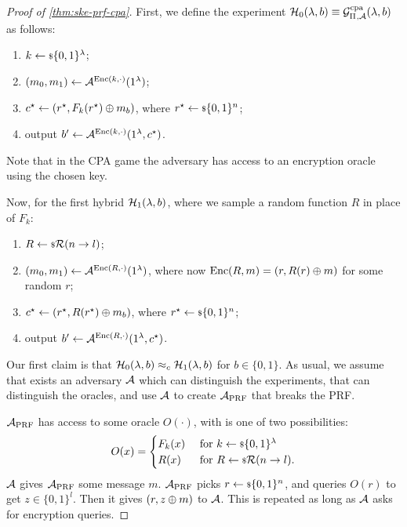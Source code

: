 \begin{proof}[Proof of \cref{thm:ske-prf-cpa}]
	First, we define the experiment $\mathcal{H}_0(\lambda, b) \equiv \mathcal{G}^{\scriptstyle \text{cpa}}_{\Pi_{},\mathcal{A}}(\lambda, b)$ as follows:
	\begin{enumerate}
		\item $k \leftarrow {\scriptstyle \$} {\{0,1\}^{\lambda}}$;
		\item $(m_0,m_1) \leftarrow \mathcal{A}^{\mathrm{Enc}(k, \cdot)} (1^{\lambda})$;
		\item $c^{\star} \leftarrow (r^{\star}, F_k(r^{\star}) \oplus m_b)$, where $r^{\star} \leftarrow {\scriptstyle \$} {\{0,1\}^{n}}$;
		\item output $b' \leftarrow \mathcal{A}^{\mathrm{Enc}(k, \cdot)} (1^{\lambda}, c^{\star})$.
	\end{enumerate}
	Note that in the \ac{CPA} game the adversary has access to an encryption oracle using the chosen key.

	Now, for the first hybrid $\mathcal{H}_1(\lambda, b)$, where we sample a random function $R$ in place of $F_k$:
	\begin{enumerate}
		\item $R \leftarrow {\scriptstyle \$} {\mathcal{R}(n \to l)}$;
		\item $(m_0,m_1) \leftarrow \mathcal{A}^{\mathrm{Enc}(R, \cdot)} (1^{\lambda})$, where now $\mathrm{Enc}(R, m) = (r, R(r) \oplus m)$ for some random $r$;
		\item $c^{\star} \leftarrow (r^{\star}, R(r^{\star}) \oplus m_b)$, where $r^{\star} \leftarrow {\scriptstyle \$} {\{0,1\}^{n}}$;
		\item output $b' \leftarrow \mathcal{A}^{\mathrm{Enc}(R, \cdot)} (1^{\lambda}, c^{\star})$.
	\end{enumerate}

	Our first claim is that $\mathcal{H}_0(\lambda, b) \approx_c \mathcal{H}_1(\lambda, b)$ for $b \in \{0,1\}$.
	As usual, we assume that exists an adversary $\mathcal{A}$ which can distinguish the experiments, \ie that can distinguish the oracles, and use $\mathcal{A}$ to create $\mathcal{A}_{\text{PRF}}$ that breaks the \ac{PRF}.

	$\mathcal{A}_{\text{PRF}}$ has access to some oracle $O(\cdot)$, with is one of two possibilities:
	\begin{equation*}
		O(x) =
		\begin{cases}
			F_k(x) & \text{ for } k \leftarrow {\scriptstyle \$} {\{0,1\}^{\lambda}} \\
			R(x) & \text{ for } R \leftarrow {\scriptstyle \$} {\mathcal{R}(n \to l)}.
		\end{cases}
	\end{equation*}
	$\mathcal{A}$ gives $\mathcal{A}_{\text{PRF}}$ some message $m$.
	$\mathcal{A}_{\text{PRF}}$ picks $r \leftarrow {\scriptstyle \$} {\{0,1\}^{n}}$, and queries $O(r)$ to get $z \in \{0,1\}^{l}$.
	Then it gives $(r, z \oplus m)$ to $\mathcal{A}$.
	This is repeated as long as $\mathcal{A}$ asks for encryption queries.


\end{proof}
